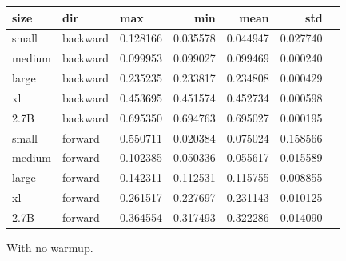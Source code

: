 \documentclass[11pt, letterpaper]{article}
\begin{document}
\begin{figure}[h]
\centering
\begin{tabular}{lllrrrr}
\toprule
size & dir & max & min & mean & std \\
\midrule
small & backward & 0.128166 & 0.035578 & 0.044947 & 0.027740 \\
medium & backward & 0.099953 & 0.099027 & 0.099469 & 0.000240 \\
large & backward & 0.235235 & 0.233817 & 0.234808 & 0.000429 \\
xl & backward & 0.453695 & 0.451574 & 0.452734 & 0.000598 \\
2.7B & backward & 0.695350 & 0.694763 & 0.695027 & 0.000195 \\
small & forward & 0.550711 & 0.020384 & 0.075024 & 0.158566 \\
medium & forward & 0.102385 & 0.050336 & 0.055617 & 0.015589 \\
large & forward & 0.142311 & 0.112531 & 0.115755 & 0.008855 \\
xl & forward & 0.261517 & 0.227697 & 0.231143 & 0.010125 \\
2.7B & forward & 0.364554 & 0.317493 & 0.322286 & 0.014090 \\
\bottomrule
\end{tabular}
\caption{With no warmup.}
\label{no-warmup}
\end{figure}
\end{document}
